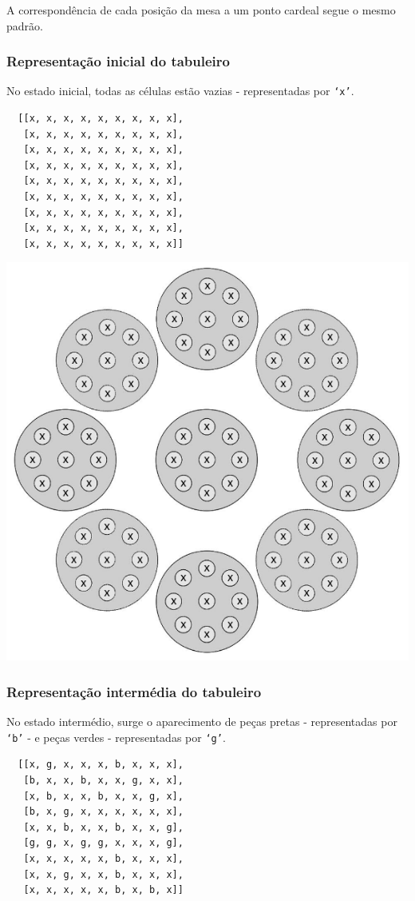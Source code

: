 \documentclass[a4paper]{article}
\begin{document}
A correspondência de cada posição da mesa a um ponto cardeal segue o mesmo padrão.

\subsubsection{Representação inicial do tabuleiro}
No estado inicial, todas as células estão vazias - representadas por \texttt{`x'}.
\begin{lstlisting}
  [[x, x, x, x, x, x, x, x, x],
   [x, x, x, x, x, x, x, x, x],
   [x, x, x, x, x, x, x, x, x],
   [x, x, x, x, x, x, x, x, x],
   [x, x, x, x, x, x, x, x, x],
   [x, x, x, x, x, x, x, x, x],
   [x, x, x, x, x, x, x, x, x],
   [x, x, x, x, x, x, x, x, x],
   [x, x, x, x, x, x, x, x, x]]
\end{lstlisting}

\includegraphics[scale=0.5]{board-setup-1.png}

\subsubsection{Representação intermédia do tabuleiro}
No estado intermédio, surge o aparecimento de peças pretas - representadas por \texttt{`b'} - e peças verdes - representadas por \texttt{`g'}.
\begin{lstlisting}
  [[x, g, x, x, x, b, x, x, x],
   [b, x, x, b, x, x, g, x, x],
   [x, b, x, x, b, x, x, g, x],
   [b, x, g, x, x, x, x, x, x],
   [x, x, b, x, x, b, x, x, g],
   [g, g, x, g, g, x, x, x, g],
   [x, x, x, x, x, b, x, x, x],
   [x, x, g, x, x, b, x, x, x],
   [x, x, x, x, x, b, x, b, x]]
\end{lstlisting}
\end{document}
